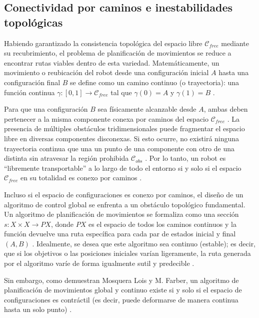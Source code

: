 \subsection{Conectividad por caminos e inestabilidades topológicas}

Habiendo garantizado la consistencia topológica del espacio libre $\mathcal{C}_{free}$ mediante su recubrimiento, 
el problema de planificación de movimientos se reduce a encontrar 
rutas viables dentro de esta variedad. Matemáticamente, un movimiento 
o reubicación del robot desde una configuración inicial $A$ hasta 
una configuración final $B$ se define como un camino continuo 
(o trayectoria): una función continua \parencite{Mosquera2017} $\gamma: [0, 1] \to \mathcal{C}_{free}$ 
tal que $\gamma(0) = A$ y $\gamma(1) = B$ \parencite{antonyan2016topologia}.

Para que una configuración $B$ sea físicamente alcanzable desde $A$, 
ambas deben pertenecer a la misma componente conexa por caminos del 
espacio $\mathcal{C}_{free}$ \parencite{oniani2019topology}. La presencia de múltiples obstáculos 
tridimensionales puede fragmentar el espacio libre en diversas 
componentes disconexas. Si esto ocurre, no existirá ninguna trayectoria 
continua que una un punto de una componente con otro de una distinta 
sin atravesar la región prohibida $\mathcal{C}_{obs}$ \parencite{manetti2023topology}. Por lo tanto, 
un robot es \enquote{libremente transportable} a lo largo de todo el entorno 
si y solo si el espacio $\mathcal{C}_{free}$ en su totalidad es conexo 
por caminos \parencite{oniani2019topology}.


Incluso si el espacio de configuraciones es conexo por caminos, 
el diseño de un algoritmo de control global se enfrenta a un obstáculo 
topológico fundamental. Un algoritmo de planificación de movimientos 
se formaliza como una sección $s: X \times X \to PX$, donde $PX$ es 
el espacio de todos los caminos continuos y la función devuelve una 
ruta específica para cada par de estados inicial y final $(A, B)$ \parencite{Mosquera2017}. 
Idealmente, se desea que este algoritmo sea continuo (estable); es decir, 
que si los objetivos o las posiciones iniciales varían ligeramente, 
la ruta generada por el algoritmo varíe de forma igualmente sutil y 
predecible \parencite{Mosquera2017}.

Sin embargo, como demuestran Mosquera Lois y M. Farber, un algoritmo de 
planificación de movimientos global y continuo existe si y solo si el 
espacio de configuraciones es contráctil (es decir, puede deformarse de 
manera continua hasta un solo punto) \parencite{Mosquera2017, farber2008}. 

